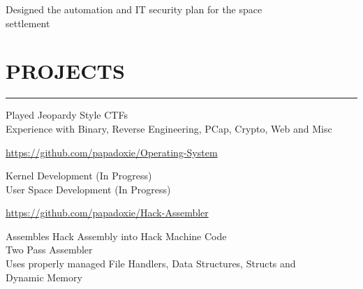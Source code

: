 \documentclass[]{resume}
\begin{document}
\begin{minipage}[t]{0.66\textwidth}
    \vspace{8pt}
     
    \vspace{4pt}
    \begin{minipage}{0.85\textwidth\vspace{4pt}}
        Designed the automation and IT security plan for the space\\settlement
    \end{minipage}



    \section{PROJECTS}
    \noindent\rule{12.80cm}{0.4pt}

     
    \vspace{4pt}
    \begin{minipage}{0.85\textwidth\vspace{2pt}}
        Played Jeopardy Style CTFs\\
        Experience with Binary, Reverse Engineering, PCap, Crypto, Web and Misc\\
    \end{minipage}

    \vspace{4pt}
     
    \href{https://github.com/papadoxie/Operating-System}{https://github.com/papadoxie/Operating-System}\\
    \vspace{4pt}
    \begin{minipage}{0.85\textwidth\vspace{2pt}}
        Kernel Development (In Progress)\\
        User Space Development (In Progress)\\
    \end{minipage}

    \vspace{4pt}
     
    \href{https://github.com/papadoxie/Hack-Assembler}{https://github.com/papadoxie/Hack-Assembler}\\
    \vspace{4pt}
    \begin{minipage}{0.85\textwidth\vspace{2pt}}
        Assembles Hack Assembly into Hack Machine Code\\
        Two Pass Assembler\\
        Uses properly managed File Handlers, Data Structures, Structs and\\Dynamic Memory
    \end{minipage}

\end{minipage}
\end{document}
